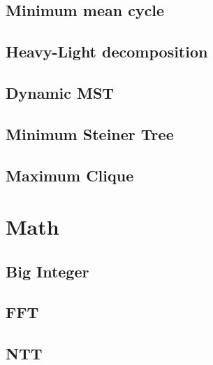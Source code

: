 \documentclass[a4paper,10pt,twocolumn,oneside]{article}
\begin{document}
%

\subsection{Minimum mean cycle}


\subsection{Heavy-Light decomposition}


\subsection{Dynamic MST}


\subsection{Minimum Steiner Tree}


\subsection{Maximum Clique}


\section{Math}
\subsection{Big Integer}


\subsection{FFT}


\subsection{NTT}

\end{document}
